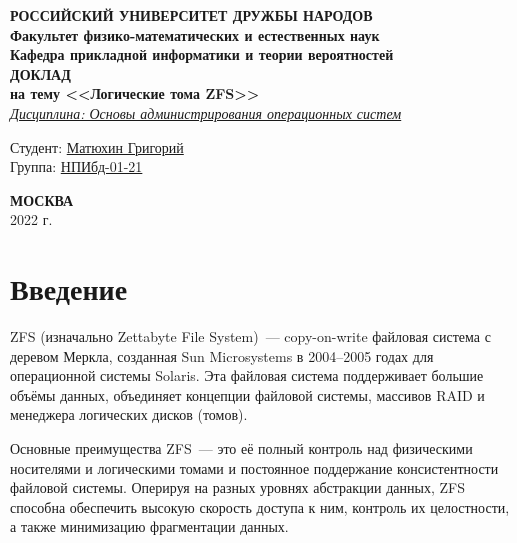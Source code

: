 \documentclass[a4page]{article}
\begin{document}


\begin{titlepage}

	\begin{center}
		\hfill \break
		\textbf{
			\large{РОССИЙСКИЙ УНИВЕРСИТЕТ ДРУЖБЫ НАРОДОВ}\\
			\normalsize{Факультет физико-математических и естественных наук}\\
			\normalsize{Кафедра прикладной информатики и теории вероятностей}\\
		}
		\vspace*{\fill}
		\Large{\textbf{ДОКЛАД\\ на тему <<Логические тома ZFS>>}}
		\\
		\underline{\textit{\normalsize{Дисциплина: Основы администрирования операционных систем}}}
		\vspace*{\fill}

	\end{center}

	\begin{flushright}
		Студент: \underline{Матюхин Григорий}\\ \vspace{0.5cm}
		Группа: \underline{НПИбд-01-21}
	\end{flushright}


	\begin{center} \textbf{МОСКВА} \\ 2022 г. \end{center}
	\thispagestyle{empty} %

\end{titlepage}

\newpage

\tableofcontents

\newpage

\section{Введение}

ZFS (изначально Zettabyte File System) — copy-on-write файловая система с деревом Меркла,
созданная Sun Microsystems в 2004–2005 годах для операционной системы Solaris.
Эта файловая система поддерживает большие объёмы данных,
объединяет концепции файловой системы, массивов RAID и менеджера логических дисков (томов).

Основные преимущества ZFS — это её полный контроль над физическими носителями и логическими томами
и постоянное поддержание консистентности файловой системы.
Оперируя на разных уровнях абстракции данных, ZFS способна обеспечить высокую скорость доступа к ним,
контроль их целостности, а также минимизацию фрагментации данных.
\end{document}
